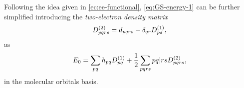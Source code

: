 \begin{comentario}
Following the idea given in \cref{ec:ee-functional}, \cref{eq:GS-energy-1}
can be further simplified introducing the \textit{two-electron density matrix}
\begin{equation} \label{eq:tedm-spin-representation}
    D^{\left( 2 \right)}_{pqrs} = d_{pqrs} - \delta_{qr} D^{\left( 1 \right)}_{ps}
    ,
\end{equation}
as
\begin{equation} \label{eq:GS-energy-2}
    E_0 =
    \sum_{pq} h_{pq} \oedm_{pq} + \frac{1}{2} \sum_{pqrs}
    \PBraket{pq | rs} \tedm_{pqrs}
    ,
\end{equation}
in the molecular orbitals basis.
\end{comentario}

